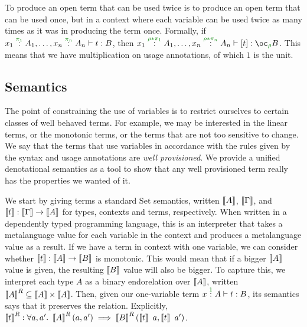 To produce an open term that can be used twice is to produce an open term that
can be used once, but in a context where each variable can be used twice as many
times as it was in producing the term once.
Formally, if
$\ctxvar{x_1}{A_1}{\pi_1}, \ldots, \ctxvar{x_n}{A_n}{\pi_n} \vdash t : B$, then
$\ctxvar{x_1}{A_1}{\rho*\pi_1}, \ldots, \ctxvar{x_n}{A_n}{\rho*\pi_n} \vdash
\bang t : \excl{\rho}{B}$.
This means that we have multiplication on usage annotations, of which $1$ is the
unit.

\subsection{Semantics}

The point of constraining the use of variables is to restrict ourselves to
certain classes of well behaved terms.
For example, we may be interested in the linear terms, or the monotonic terms,
or the terms that are not too sensitive to change.
We say that the terms that use variables in accordance with the rules given by
the syntax and usage annotations are \emph{well provisioned}.
We provide a unified denotational semantics as a tool to show that any well
provisioned term really has the properties we wanted of it.

We start by giving terms a standard $\mathrm{Set}$ semantics, written $\left\llbracket A \right\rrbracket$, $\left\llbracket \Gamma \right\rrbracket$, and $\left\llbracket t \right\rrbracket : \left\llbracket \Gamma \right\rrbracket \to \left\llbracket A \right\rrbracket$ for types, contexts and
terms, respectively.
When written in a dependently typed programming language, this is an interpreter
that takes a metalanguage value for each variable in the context and produces a
metalanguage value as a result.
If we have a term in context with one variable, we can consider whether $\left\llbracket t \right\rrbracket
: \left\llbracket A \right\rrbracket \to \left\llbracket B \right\rrbracket$ is monotonic.
This would mean that if a bigger $\left\llbracket A \right\rrbracket$ value is given, the resulting $\left\llbracket B \right\rrbracket$
value will also be bigger.
To capture this, we interpret each type $A$ as a binary endorelation over $\left\llbracket A \right\rrbracket$, written $\left\llbracket A \right\rrbracket^R \subseteq \left\llbracket A \right\rrbracket \times \left\llbracket A \right\rrbracket$.
Then, given our one-variable term $\ctxvar{x}{A}{1} \vdash t : B$, its semantics
says that it preserves the relation.
Explicitly, $\left\llbracket t \right\rrbracket^R :
\forall a, a'.~\left\llbracket A \right\rrbracket^R(a, a') \implies \left\llbracket B \right\rrbracket^R(\left\llbracket t \right\rrbracket~a, \left\llbracket t \right\rrbracket~a')$.


